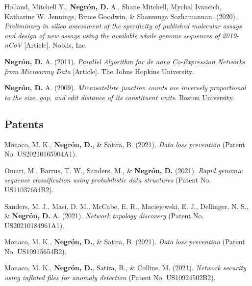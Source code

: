 \documentclass[11pt,a4paper,]{awesome-cv}
\begin{document}
\leavevmode{}%
Holland, Mitchell Y., \textbf{Negrón, D.} A., Shane Mitchell, Mychal
Ivancich, Katharine W. Jennings, Bruce Goodwin, \& Shanmuga Sozhamannan.
(2020). \emph{Preliminary in silico assessment of the specificity of
published molecular assays and design of new assays using the available
whole genome sequences of 2019-nCoV} {[}Article{]}. Noblis, Inc.

\leavevmode{}%
\textbf{Negrón, D.} A. (2011). \emph{Parallel Algorithm for de novo
Co-Expression Networks from Microarray Data} {[}Article{]}. The Johns
Hopkins University.

\leavevmode{}%
\textbf{Negrón, D.} A. (2009). \emph{Microsatellite junction counts are
inversely proportional to the size, gap, and edit distance of its
constituent units}. Boston University.

\hypertarget{patents}{%
\subsection{Patents}\label{patents}}

\hypertarget{bibliography}{}
\leavevmode{}%
Monaco, M. K., \textbf{Negrón, D.}, \& Satira, B. (2021). \emph{Data
loss prevention} (Patent No. US20210165904A1).

\leavevmode{}%
Omari, M., Barrus, T. W., Sanders, M., \& \textbf{Negrón, D.} (2021).
\emph{Rapid genomic sequence classification using probabilistic data
structures} (Patent No. US11037654B2).

\leavevmode{}%
Sanders, M. J., Masi, D. M., McCabe, E. R., Maciejewski, E. J.,
Dellinger, N. S., \& \textbf{Negrón, D.} A. (2021). \emph{Network
topology discovery} (Patent No. US20210184961A1).

\leavevmode{}%
Monaco, M. K., \textbf{Negrón, D.}, \& Satira, B. (2021). \emph{Data
loss prevention} (Patent No. US10915654B2).

\leavevmode{}%
Monaco, M. K., \textbf{Negrón, D.}, Satira, B., \& Collins, M. (2021).
\emph{Network security using inflated files for anomaly detection}
(Patent No. US10924502B2).
\end{document}

